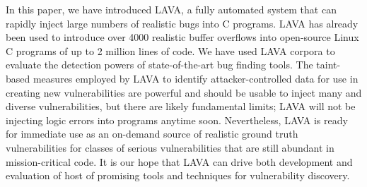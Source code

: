 In this paper, we have introduced LAVA, a fully automated system that can rapidly inject large numbers of realistic bugs into C programs.
LAVA has already been used to introduce over 4000 realistic buffer overflows into open-source Linux C programs of up to 2 million lines of code.  
We have used LAVA corpora to evaluate the detection powers of state-of-the-art bug finding tools.
The taint-based measures employed by LAVA to identify attacker-controlled data for use in creating new vulnerabilities are powerful and should be usable to inject many and diverse vulnerabilities, but there are likely fundamental limits; LAVA will not be injecting logic errors into programs anytime soon.
Nevertheless, LAVA is ready for immediate use as an on-demand source of realistic ground truth vulnerabilities for classes of serious vulnerabilities that are still abundant in mission-critical code.
It is our hope that LAVA can drive both development and evaluation of host of promising tools and techniques for vulnerability discovery.


